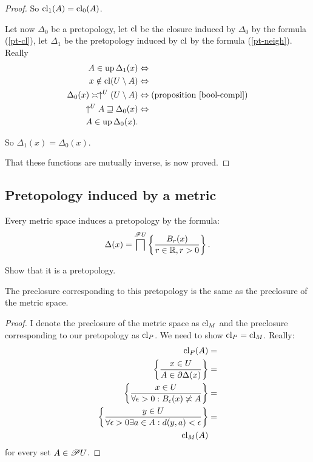 \begin{proof}
So $\operatorname{cl}_{1}(A)=\operatorname{cl}_{0}(A)$.

Let now $\Delta_{0}$ be a pretopology, let $\operatorname{cl}$ be the closure
induced by $\Delta_{0}$ by the formula (\ref{pt-cl}), let $\Delta_{1}$
be the pretopology induced by $\operatorname{cl}$ by the formula (\ref{pt-neigh}).
Really
\begin{align*}
A\in\operatorname{up}\Delta_{1}(x) & \Leftrightarrow\\
x\notin\operatorname{cl}(U\setminus A) & \Leftrightarrow\\
\Delta_{0}(x)\asymp\uparrow^{U}(U\setminus A) & \Leftrightarrow\text{(proposition \ref{bool-compl})}\\
\uparrow^{U}A\sqsupseteq\Delta_{0}(x) & \Leftrightarrow\\
A\in\operatorname{up}\Delta_{0}(x).
\end{align*}


So $\Delta_{1}(x)=\Delta_{0}(x)$.

That these functions are mutually inverse, is now proved.
\end{proof}

\subsection{Pretopology induced by a metric}

Every metric space induces
a pretopology by the formula:
\[
\Delta(x)=\bigsqcap^{\mathscr{F}U}\left\{ \frac{B_{r}(x)}{r\in\mathbb{R},r>0}\right\}.
\]

\begin{xca}
Show that it is a pretopology.\end{xca}
\begin{prop}
The preclosure corresponding to this pretopology is the same as the
preclosure of the metric space.\end{prop}
\begin{proof}
I denote the preclosure of the metric space as $\operatorname{cl}_{M}$ and the
preclosure corresponding to our pretopology as $\operatorname{cl}_{P}$. We need
to show $\operatorname{cl}_{P}=\operatorname{cl}_{M}$. Really:
\begin{align*}
\operatorname{cl}_{P}(A) & =\\
\left\{ \frac{x\in U}{A\in\partial\Delta(x)}\right\} & =\\
\left\{ \frac{x\in U}{\forall\epsilon>0:B_{\epsilon}(x)\not\asymp A}\right\} & =\\
\left\{ \frac{y\in U}{\forall\epsilon>0\exists a\in A:d(y,a)<\epsilon}\right\} & =\\
\operatorname{cl}_{M}(A)
\end{align*}
for every set $A\in\mathscr{P} U$.
\end{proof}

